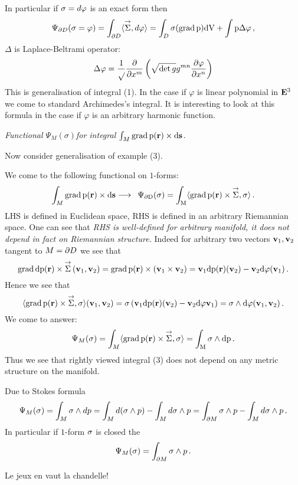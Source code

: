 In particular if ${\sigma}=d\varphi$ is an exact form then
   $$
\Psi_{\p D}(\sigma=\varphi)=
\int_{\p D}\langle\Sv,d\varphi\rangle=
\int_D\s(\grad p)dV+\int p\Delta\varphi\,,
   $$
$\Delta$ is Laplace-Beltrami operator: 
    $$
 \Delta\varphi=
 {1\over \sqrt{}}{\partial\over \partial x^m}\left(
  \sqrt{\det g}g^{mn}{\partial\varphi\over \partial x^n}
     \right)
       $$
This is generalisation of integral (1). In the case 
if $\varphi$ is linear polynomial
in ${\bf E}^3$ we come to standard Archimedes's integral. 
It is interesting to look at this formula
in the case if $\varphi$ is an arbitrary harmonic function.

\m

\centerline
{\sl Functional $\Psi_M(\sigma)$for integral 
$\int_M \rm grad\, p({\bf r})\times d{\bf s }$.}


Now consider generalisation of example (3).

We come to the following functional on $1$-forms:
      $$
\int_M \grad p(\r)\times d\ss\longrightarrow\,\,\,
 \Psi_{\p D}(\s)=\int_{M} \langle\grad p(\r)\times\Sv,\s\rangle\,.
         $$
LHS is defined in Euclidean space, RHS is defined in an arbitrary 
Riemannian space. One can see that 
{\it RHS is well-defined 
for arbitrary manifold, it does not depend in fact on Riemannian structure.}
Indeed for
arbitrary two vectors ${\bf v}_1,{\bf v}_2$ tangent to $M=\partial D$  we see that
      $$
\grad d p(\r)\times\Sv \left(\v_1,\v_2\right)=
 \grad p(\r)\times\left(\v_1\times\v_2\right)=
 \v_1 d p(\r)(\v_2)-\v_2d\varphi(\v_1)\,.
      $$
Hence we see that 
      $$ 
 \langle \grad p(\r)\times
 \Sv,\s\rangle(\v_1,\v_2)=\sigma\left(
    \v_1 d p(\r)(\v_2)-\v_2d\varphi\v_1
         \right)=\sigma\wedge d\varphi (\v_1,\v_2)\,.
$$
We come to answer:
      $$
 \Psi_{M}(\s)=\int_{M} \langle\grad p(\r)\times\Sv,\s\rangle
            =
\int_{M}\sigma\wedge dp\,.
      $$
Thus we see that rightly viewed integral (3) does not 
depend on any metric structure on the manifold.

Due to Stokes formula
     $$
\Psi_M({\sigma})=\int_M{\sigma}\wedge d p=\int_M d({\sigma}\wedge p)-\int_M d{\sigma}\wedge p=
   \int_{\partial M}{\sigma}\wedge p-\int_M d{\sigma}\wedge p\,. 
     $$
In particular if $1$-form ${\sigma}$ is closed the
     $$
\Psi_M({\sigma})=\int_{\partial M}{\sigma}\wedge p\,.
     $$

\centerline { Le jeux en vaut la chandelle!}




\bye
